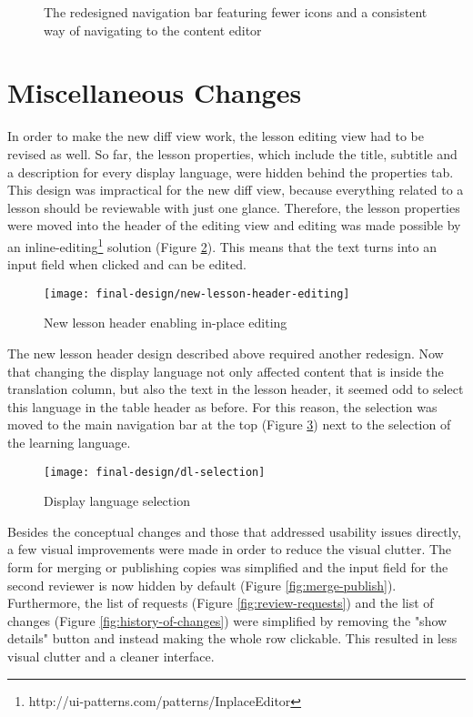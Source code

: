 \begin{figure}[h!]
 \centering
 \caption{The redesigned navigation bar featuring fewer icons and a consistent way of navigating to the content editor}
 \label{fig:redesigned-nav}
\end{figure}

\section{Miscellaneous Changes}
In order to make the new diff view work, the lesson editing view had to be revised as well. So far, the lesson properties, which include the title, subtitle and a description for every display language, were hidden behind the properties tab. This design was impractical for the new diff view, because everything related to a lesson should be reviewable with just one glance. Therefore, the lesson properties were moved into the header of the editing view and editing was made possible by an inline-editing\footnote{http://ui-patterns.com/patterns/InplaceEditor} solution (Figure \ref{fig:new-lesson-header}). This means that the text turns into an input field when clicked and can be edited.

\begin{figure}[h!]
 \centering
 \texttt{[image: final-design/new-lesson-header-editing]}
 \caption{New lesson header enabling in-place editing}
 \label{fig:new-lesson-header}
\end{figure}

The new lesson header design described above required another redesign. Now that changing the display language not only affected content that is inside the translation column, but also the text in the lesson header, it seemed odd to select this language in the table header as before. For this reason, the selection was moved to the main navigation bar at the top (Figure \ref{fig:dl-selection}) next to the selection of the learning language.

\begin{figure}[h!]
 \centering
 \texttt{[image: final-design/dl-selection]}
 \caption{Display language selection}
 \label{fig:dl-selection}
\end{figure}

Besides the conceptual changes and those that addressed usability issues directly, a few visual improvements were made in order to reduce the visual clutter. The form for merging or publishing copies was simplified and the input field for the second reviewer is now hidden by default (Figure \ref{fig:merge-publish}). Furthermore, the list of requests (Figure \ref{fig:review-requests}) and the list of changes (Figure \ref{fig:history-of-changes}) were simplified by removing the "show details" button and instead making the whole row clickable. This resulted in less visual clutter and a cleaner interface.

